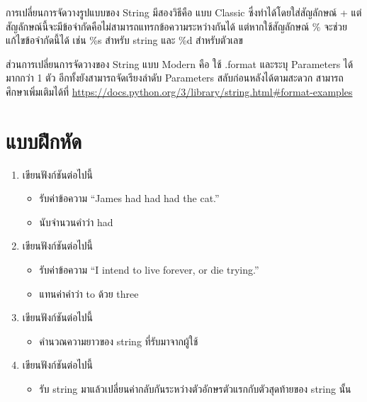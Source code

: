 การเปลี่ยนการจัดวางรูปแบบของ String มีสองวิธีคือ แบบ Classic ซึ่งทำได้โดยใส่สัญลักษณ์ + แต่สัญลักษณ์นี้จะมีข้อจำกัดคือไม่สามารถแทรกข้อความระหว่างกันได้ แต่หากใช้สัญลักษณ์ \% จะช่วยแก้ไขข้อจำกัดนี้ได้ เช่น \%s สำหรับ string และ \%d สำหรับตัวเลข 

ส่วนการเปลี่ยนการจัดวางของ String แบบ Modern คือ ใช้ .format และระบุ Parameters ได้มากกว่า 1 ตัว อีกทั้งยังสามารถจัดเรียงลำดับ Parameters สลับก่อนหลังได้ตามสะดวก สามารถศึกษาเพิ่มเติมได้ที่ \url{https://docs.python.org/3/library/string.html\#format-examples}

\section{แบบฝึกหัด}
\begin{enumerate} 
\item 	เขียนฟังก์ชันต่อไปนี้
\begin{itemize}
\item 	รับค่าข้อความ “James had had had the cat.”
\item 	นับจำนวนคำว่า had
\end{itemize}
\item 	เขียนฟังก์ชันต่อไปนี้
\begin{itemize}
\item 	รับค่าข้อความ “I intend to live forever, or die trying.”
\item 	แทนค่าคำว่า to ด้วย three
\end{itemize}
\item 	เขียนฟังก์ชันต่อไปนี้
\begin{itemize}
\item 	คำนวณความยาวของ string ที่รับมาจากผู้ใช้
\end{itemize}
\item 	เขียนฟังก์ชันต่อไปนี้
\begin{itemize}
\item 	รับ string มาแล้วเปลี่ยนค่ากลับกันระหว่างตัวอักษรตัวแรกกับตัวสุดท้ายของ string นั้น
\end{itemize}
\end{enumerate}


